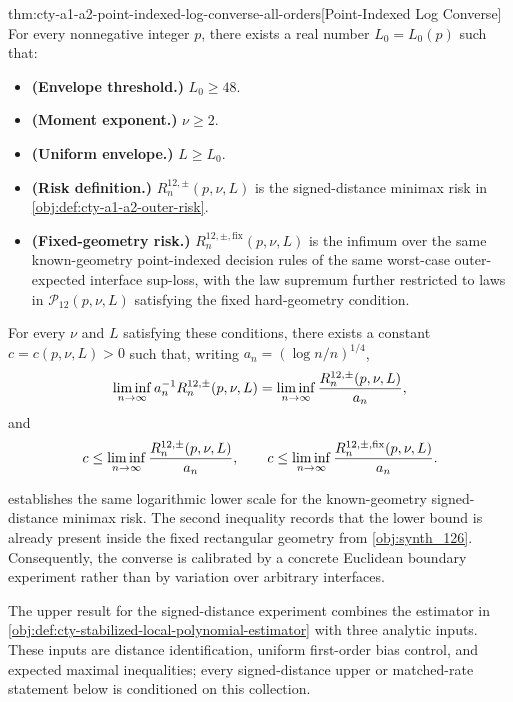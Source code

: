 \begin{theoremv}{thm:cty-a1-a2-point-indexed-log-converse-all-orders}[Point-Indexed Log Converse]
For every nonnegative integer \(p\), there exists a real number \(L_0=L_0(p)\) such that:
\begin{itemize}
\item \textbf{(Envelope threshold.)} \(L_0\ge 48\).
\item \textbf{(Moment exponent.)} \(\nu\ge 2\).
\item \textbf{(Uniform envelope.)} \(L\ge L_0\).
\item \textbf{(Risk definition.)} \(R^{12,\pm}_n(p,\nu,L)\) is the signed-distance minimax risk in \cref{obj:def:cty-a1-a2-outer-risk}.
\item \textbf{(Fixed-geometry risk.)} \(R^{12,\pm,\mathrm{fix}}_n(p,\nu,L)\) is the infimum over the same known-geometry point-indexed decision rules of the same worst-case outer-expected interface sup-loss, with the law supremum further restricted to laws in \(\mathcal P_{12}(p,\nu,L)\) satisfying the fixed hard-geometry condition.
\end{itemize}
For every \(\nu\) and \(L\) satisfying these conditions, there exists a constant \(c=c(p,\nu,L)>0\) such that, writing \(a_n=(\log n/n)^{1/4}\),
\[
\liminf_{n\to\infty} a_n^{-1}R^{12,\pm}_n(p,\nu,L)
=
\liminf_{n\to\infty}{R^{12,\pm}_n(p,\nu,L)\over a_n},
\]
and
\[
c
\le
\liminf_{n\to\infty}{R^{12,\pm}_n(p,\nu,L)\over a_n},
\qquad
c
\le
\liminf_{n\to\infty}{R^{12,\pm,\mathrm{fix}}_n(p,\nu,L)\over a_n}.
\]
\end{theoremv}

 establishes the same logarithmic lower scale for the known-geometry signed-distance minimax risk. The second inequality records that the lower bound is already present inside the fixed rectangular geometry from \cref{obj:synth_126}. Consequently, the converse is calibrated by a concrete Euclidean boundary experiment rather than by variation over arbitrary interfaces.

The upper result for the signed-distance experiment combines the estimator in \cref{obj:def:cty-stabilized-local-polynomial-estimator} with three analytic inputs. These inputs are distance identification, uniform first-order bias control, and expected maximal inequalities; every signed-distance upper or matched-rate statement below is conditioned on this collection.

